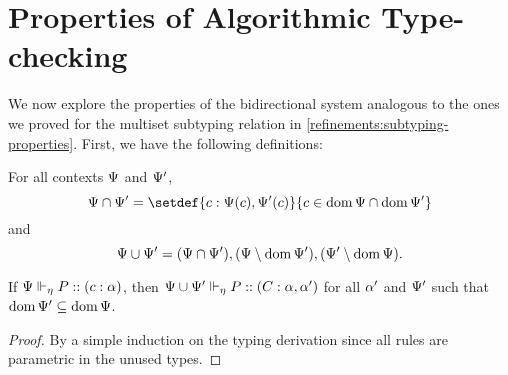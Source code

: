 
\section{Properties of Algorithmic Type-checking}

We now explore the properties of the bidirectional system analogous to the ones we proved for the multiset subtyping relation in \cref{refinements:subtyping-properties}. First, we have the following definitions:
\begin{definition}
  For all contexts $\Psi$ and $\Psi'$,
  $$ \ctx \cap \ctx' = \setdef{c : \lookup \ctx c, \lookup {\ctx'} c}{c \in \dom\ctx \cap \dom{\ctx'}}
  $$
  and
  $$ \Psi \cup \Psi' =  (\Psi \cap \Psi'), (\Psi \setminus \operatorname{dom}{\Psi'}), (\Psi' \setminus \operatorname{dom}{\Psi}).
  $$
\end{definition}

\begin{lemma}[Weakening]
  If ${\Psi} \Vdash_{\eta} P :: (c : \alpha)$, then ${\Psi \cup \Psi'} \Vdash_{\eta} P :: (C : \alpha, \alpha')$ for all $\alpha'$ and $\Psi'$ such that $\operatorname{dom}{\Psi'} \subseteq \operatorname{dom}\Psi$.
\end{lemma}
\begin{proof}
  By a simple induction on the typing derivation since all rules are parametric in the unused types.
\end{proof}


